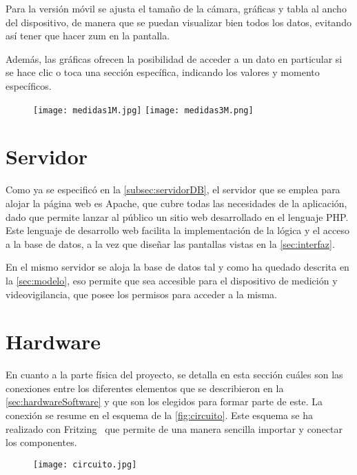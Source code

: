 Para la versión móvil se ajusta el tamaño de la cámara, gráficas y tabla al ancho del dispositivo, de manera que se puedan visualizar bien todos los datos, evitando así tener que hacer zum en la pantalla.
\pagebreak

Además, las gráficas ofrecen la posibilidad de acceder a un dato en particular si se hace clic o toca una sección específica, indicando los valores y momento específicos.
\begin{figure}[H]
	{\texttt{[image: medidas1M.jpg]}
		\texttt{[image: medidas3M.png]}}
\end{figure}

\section{Servidor}\label{sec:servidor}
Como ya se especificó en la \autoref{subsec:servidorDB}, el servidor que se emplea para alojar la página web es Apache, que cubre todas las necesidades de la aplicación, dado que permite lanzar al público un sitio web desarrollado en el lenguaje PHP. Este lenguaje de desarrollo web facilita la implementación de la lógica y el acceso a la base de datos, a la vez que diseñar las pantallas vistas en la \autoref{sec:interfaz}. 

En el mismo servidor se aloja la base de datos tal y como ha quedado descrita en la \autoref{sec:modelo}, eso permite que sea accesible para el dispositivo de medición y videovigilancia, que posee los permisos para acceder a la misma.
\pagebreak

\section{Hardware}\label{sec:hardware}
En cuanto a la parte física del proyecto, se detalla en esta sección cuáles son las conexiones entre los diferentes elementos que se describieron en la \autoref{sec:hardwareSoftware} y que son los elegidos para formar parte de este. La conexión se resume en el esquema de la \autoref{fig:circuito}. Este esquema se ha realizado con Fritzing~\cite{fritzing_fritzing_nodate} que permite de una manera sencilla importar y conectar los componentes.
\begin{figure}[H]
	{\texttt{[image: circuito.jpg]}}
\end{figure}

